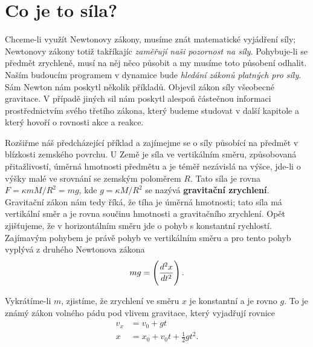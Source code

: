  \section{Co je to síla?}\label{fyz:IchapIXsecIV}
    Chceme-li využít Newtonovy zákony, musíme znát matematické vyjádření síly; Newtonovy zákony 
    totiž takříkajíc \emph{zaměřují naši pozornost na síly}. Pohybuje-li se předmět zrychleně, musí 
    na něj něco působit a my musíme toto působení odhalit. Naším budoucím programem v dynamice bude 
    \emph{hledání zákonů platných pro síly}. Sám Newton nám poskytl několik příkladů. Objevil zákon 
    síly všeobecné gravitace. V případě jiných sil nám poskytl alespoň částečnou informaci 
    prostřednictvím svého třetího zákona, který budeme studovat v další kapitole a který hovoří o 
    rovnosti akce a reakce.
    
    Rozšiřme náš předcházející příklad a zajímejme se o síly působící na předmět v blízkosti 
    zemského povrchu. U Země je síla ve vertikálním směru, způsobovaná přitažlivostí, úměrná 
    hmotnosti předmětu a je téměř nezávislá na výšce, jde-li o výšky malé ve srovnání se zemským 
    poloměrem \(R\). Tato síla je rovna \(F= \kappa mM/R^2 = mg\), kde \(g = \kappa M/R^2\) se 
    nazývá \textbf{gravitační zrychlení}. Gravitační zákon nám tedy říká, že tíha je úměrná 
    hmotnosti; tato síla má vertikální směr a je rovna součinu hmotnosti a gravitačního zrychlení. 
    Opět zjišťujeme, že v horizontálním směru jde o pohyb s konstantní rychlostí. Zajímavým pohybem 
    je právě pohyb ve vertikálním směru a pro tento pohyb vyplývá z druhého Newtonova zákona
    \begin{equation}\label{FYZ:eq126}
      mg=\left(\dfrac{d^2 x}{d t^2}\right).
    \end{equation}
    
    Vykrátíme-li \(m\), zjistíme, že zrychlení ve směru \(x\) je konstantní a je rovno \(g\). To je 
    známý zákon volného pádu pod vlivem gravitace, který vyjadřují rovnice
    \begin{align}
      v_x &= v_0 + gt                       \nonumber \\
        x &= x_0 + v_0t + \frac{1}{2}gt^2.  \label{FYZ:eq127}
    \end{align}
    
